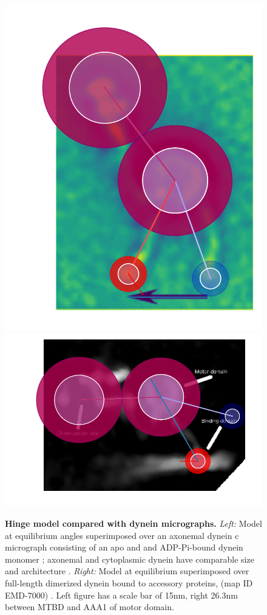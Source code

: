 \documentclass[9pt,twocolumn,twoside]{pnas-new}
\begin{document}
\begin{figure}[tbhp]
\includegraphics[width=0.4\linewidth]{../../plots/burgess-model-figure.pdf}%
\includegraphics[width=0.6\linewidth]{../../plots/grotjahn-model-figure.pdf}%
\caption{\textbf{Hinge model compared with dynein micrographs.} \textit{Left:} Model at equilibrium angles superimposed over an axonemal dynein c micrograph consisting of an apo and and ADP-Pi-bound dynein monomer \cite{burgess-paper}; axonemal and cytoplasmic dynein have comparable size and architecture \cite{dynein-c-paper}. \textit{Right:} Model at equilibrium superimposed over full-length dimerized dynein bound to accessory proteins, (map ID EMD-7000) \cite{grotjahn}. Left figure has a scale bar of 15nm, right 26.3nm between MTBD and AAA1 of motor domain.}
\label{fig:micrographs}
\end{figure}
\end{document}
